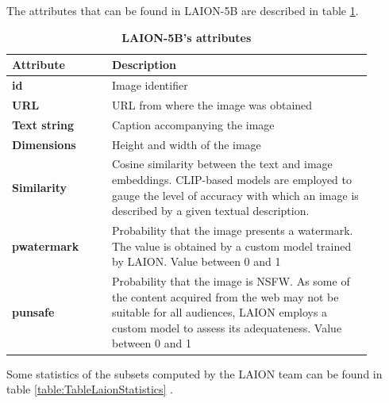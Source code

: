 The attributes that can be found in LAION-5B are described in table \ref{table:TableLaionAttributes}.

\begin{table}[ht]
\centering
\begin{tabular}{|p{0.25\linewidth} | p{0.65\linewidth}|}
\hline
\rowcolor[HTML]{9B9B9B} 
{\textbf{Attribute}} & {\textbf{Description}} \\ \hline
\textbf{id} & Image identifier \\ \hline
\textbf{URL} & URL from where the image was obtained \\ \hline
\textbf{Text string} & Caption accompanying the image \\ \hline
\textbf{Dimensions} & Height and width of the image \\ \hline
\textbf{Similarity} & Cosine similarity between the text and image embeddings. CLIP-based   models are employed to gauge the level of accuracy with which an image is   described by a given textual description.\\ \hline
\textbf{pwatermark} & Probability that the image presents a watermark. The value is   obtained by a custom model trained by LAION. Value between 0 and 1 \\ \hline
\textbf{punsafe} & Probability that the image is NSFW. As some of the content   acquired from the web may not be suitable for all audiences, LAION employs a   custom model to assess its adequateness. Value between 0 and 1 \\ \hline
\end{tabular}
\caption{\textbf{LAION-5B’s attributes}}
\label{table:TableLaionAttributes}
\end{table}

Some statistics of the subsets computed by the LAION team can be found in table \ref{table:TableLaionStatistics} \cite{schuhmann2022laion}.

